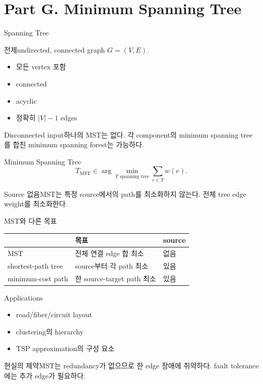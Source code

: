 \section{Part G. Minimum Spanning Tree}
\begin{frame}{Spanning Tree}
\begin{block}{전제}undirected, connected graph \(G=(V,E)\).\end{block}
\begin{itemize}\item 모든 vertex 포함\item connected\item acyclic\item 정확히 \(|V|-1\) edges\end{itemize}
\begin{alertblock}{Disconnected input}하나의 MST는 없다. 각 component의 minimum spanning tree를 합친 minimum spanning forest는 가능하다.\end{alertblock}
\end{frame}
\begin{frame}{Minimum Spanning Tree}
\[
T_{\mathrm{MST}}\in\arg\min_{T\text{ spanning tree}}\sum_{e\in T}w(e).
\]
\begin{block}{Source 없음}MST는 특정 source에서의 path를 최소화하지 않는다. 전체 tree edge weight를 최소화한다.\end{block}
\end{frame}
\begin{frame}{MST와 다른 목표}
\small\begin{tabular}{lll}\toprule&목표&source\\\midrule
MST&전체 연결 edge 합 최소&없음\\
shortest-path tree&source부터 각 path 최소&있음\\
minimum-cost path&한 source-target path 최소&있음\\\bottomrule\end{tabular}
\end{frame}
\begin{frame}{Applications}
\begin{itemize}\item road/fiber/circuit layout\item clustering의 hierarchy\item TSP approximation의 구성 요소\end{itemize}
\begin{alertblock}{현실의 제약}MST는 redundancy가 없으므로 한 edge 장애에 취약하다. fault tolerance에는 추가 edge가 필요하다.\end{alertblock}
\end{frame}
